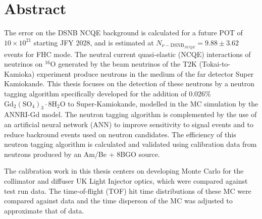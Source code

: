 \chapter*{Abstract}
\thispagestyle{empty}

The error on the DSNB NCQE background is calculated for a future POT of $10 \times 10^{21}$ starting JFY 2028, and is estimated at $N_{\nu-\mathrm{DSNB}_{NCQE}}= 9.88 \pm 3.62$ events for FHC mode. The neutral current quasi-elastic (NCQE) interactions of neutrinos on ${ }^{16} \mathrm{O}$ generated by the beam neutrinos of the T2K (Tokai-to-Kamioka) experiment produce neutrons in the medium of the far detector Super Kamiokande. This thesis focuses on the detection of these neutrons by a neutron tagging algorithm specifically developed for the addition of 0.026\% $\mathrm{Gd}_{2}\left(\mathrm{SO}_{4}\right)_{3} \cdot 8 \mathrm{H}_{2} \mathrm{O}$ to Super-Kamiokande, modelled in the MC simulation by the ANNRI-Gd model. The neutron tagging algorithm is complemented by the use of an artificial neural network (ANN) to improve sensitivity to signal events and to reduce backround events used on neutron candidates. The efficiency of this neutron tagging algorithm is calculated and validated using calibration data from neutrons produced by an Am/Be + 8BGO source.

The calibration work in this thesis centers on developing Monte Carlo for the collimator and diffuser UK Light Injector optics, which were compared against test run data. The time-of-flight (TOF) hit time distributions of these MC were compared against data and the time disperson of the MC was adjusted to approximate that of data.